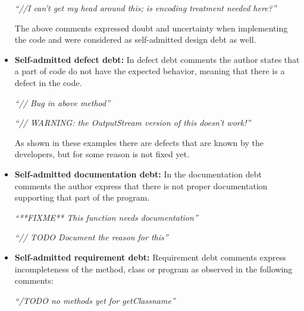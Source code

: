 \begin{itemize}
\begin{displayquote}
      \vspace{1mm}

      \textit{``//I can't get my head around this; is encoding treatment needed here?''}
  \end{displayquote}
  \vspace{1mm}

  The above comments expressed doubt and uncertainty when implementing the code and were considered as self-admitted design debt as well.

  \item \textbf{Self-admitted defect debt:} In defect debt comments the author states that a part of code do not have the expected behavior, meaning that there is a defect in the code. 
  
  \vspace{1mm}
  \begin{displayquote}
      \textit{``// Bug in above method''}

      \vspace{1mm}

      \textit{``// WARNING: the OutputStream version of this doesn't work!''}
  \end{displayquote}
  \vspace{1mm}
  
  As shown in these examples there are defects that are known by the developers, but for some reason is not fixed yet. 

  \item \textbf{Self-admitted documentation debt:} In the documentation debt comments the author express that there is not proper documentation supporting that part of the program.
  
  \vspace{1mm}
  \begin{displayquote}
  	\textit{``**FIXME** This function needs documentation''}
  	
  	\vspace{1mm}
  	
  	\textit{``// TODO Document the reason for this''}
  \end{displayquote}
  \vspace{1mm}
  
  \item \textbf{Self-admitted requirement debt:} Requirement debt comments express incompleteness of the method, class or program as observed in the following comments:
  
  \begin{displayquote}
  	\textit{``/TODO no methods yet for getClassname''}
  	

\end{displayquote}
\end{itemize}
